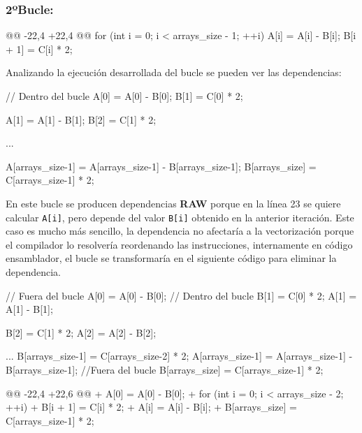\subsubsection{\textbf{2ºBucle:}}
\begin{listing}[firstnumber=21]
    @@ -22,4 +22,4 @@
    for (int i = 0; i < arrays_size - 1; ++i) {
      A[i] = A[i] - B[i];
      B[i + 1] = C[i] * 2;
    }
\end{listing}
\par Analizando la ejecución desarrollada del bucle se pueden ver las dependencias:
\begin{listing}[numbers=none]
    // Dentro del bucle
    A[0] = A[0] - B[0];
    B[1] = C[0] * 2;

    A[1] = A[1] - B[1];
    B[2] = C[1] * 2;

            ...

    A[arrays_size-1] = A[arrays_size-1] - B[arrays_size-1];
    B[arrays_size] = C[arrays_size-1] * 2; 
\end{listing}
\par En este bucle se producen dependencias \textbf{RAW} porque en la línea 23 se quiere calcular \texttt{A[i]}, pero depende del valor \texttt{B[i]} obtenido
en la anterior iteración. Este caso es mucho más sencillo, la dependencia no afectaría a la vectorización porque el compilador lo
resolvería reordenando las instrucciones, internamente en código ensamblador, el bucle se transformaría en el siguiente código
para eliminar la dependencia.
\begin{listing}[numbers=none]
    // Fuera del bucle
    A[0] = A[0] - B[0];
    // Dentro del bucle
    B[1] = C[0] * 2;
    A[1] = A[1] - B[1];

    B[2] = C[1] * 2;
    A[2] = A[2] - B[2];

            ...
    B[arrays_size-1] = C[arrays_size-2] * 2;
    A[arrays_size-1] = A[arrays_size-1] - B[arrays_size-1];
    //Fuera del bucle
    B[arrays_size] = C[arrays_size-1] * 2; 
\end{listing}
\begin{listing}[firstnumber=21]
    @@ -22,4 +22,6 @@
    + A[0] = A[0] - B[0];
    + for (int i = 0; i < arrays_size - 2; ++i) {
    +    B[i + 1] = C[i] * 2;
    +    A[i] = A[i] - B[i];
    }
    + B[arrays_size] = C[arrays_size-1] * 2;
\end{listing}